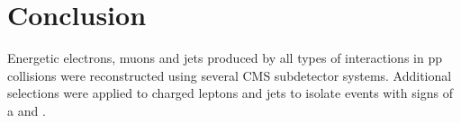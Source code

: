 \section{Conclusion}
\label{sec:recoConclusion}
Energetic electrons, muons and jets produced by all types of interactions in pp collisions were 
reconstructed using several CMS subdetector systems.  Additional selections were applied to charged leptons 
and jets to isolate events with signs of a \WR and \nul.

